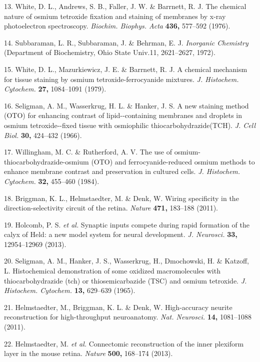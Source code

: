 \documentclass{article}
\newenvironment{reflist}{\par\small\setlength{\parindent}{0pt}\everypar{\hangindent=1.6em\hangafter=1}}{\par}
\begin{document}
\begin{reflist}
13. White, D. L., Andrews, S. B., Faller, J. W. \& Barrnett, R. J. The chemical nature of osmium tetroxide fixation and staining of membranes by x-ray photoelectron spectroscopy. \emph{Biochim. Biophys. Acta} \textbf{436,} 577–592 (1976).

14. Subbaraman, L. R., Subbaraman, J. \& Behrman, E. J. \emph{Inorganic Chemistry} (Department of Biochemistry, Ohio State Univ.11, 2621–2627, 1972).

15. White, D. L., Mazurkiewicz, J. E. \& Barrnett, R. J. A chemical mechanism for tissue staining by osmium tetroxide-ferrocyanide mixtures. \emph{J. Histochem. Cytochem.} \textbf{27,} 1084–1091 (1979).

16. Seligman, A. M., Wasserkrug, H. L. \& Hanker, J. S. A new staining method (OTO) for enhancing contrast of lipid-{}-containing membranes and droplets in osmium tetroxide-{}-fixed tissue with osmiophilic thiocarbohydrazide(TCH). \emph{J. Cell Biol.} \textbf{30,} 424–432 (1966).

17. Willingham, M. C. \& Rutherford, A. V. The use of osmium-thiocarbohydrazide-osmium (OTO) and ferrocyanide-reduced osmium methods to enhance membrane contrast and preservation in cultured cells. \emph{J. Histochem. Cytochem.} \textbf{32,} 455–460 (1984).

18. Briggman, K. L., Helmstaedter, M. \& Denk, W. Wiring specificity in the direction-selectivity circuit of the retina. \emph{Nature} \textbf{471,} 183–188 (2011).

19. Holcomb, P. S. \emph{et al.} Synaptic inputs compete during rapid formation of the calyx of Held: a new model system for neural development. \emph{J. Neurosci.} \textbf{33,} 12954–12969 (2013).

20. Seligman, A. M., Hanker, J. S., Wasserkrug, H., Dmochowski, H. \& Katzoff, L. Histochemical demonstration of some oxidized macromolecules with thiocarbohydrazide (tch) or thiosemicarbazide (TSC) and osmium tetroxide. \emph{J. Histochem. Cytochem.} \textbf{13,} 629–639 (1965).

21. Helmstaedter, M., Briggman, K. L. \& Denk, W. High-accuracy neurite reconstruction for high-throughput neuroanatomy. \emph{Nat. Neurosci.} \textbf{14,} 1081–1088 (2011).

22. Helmstaedter, M. \emph{et al.} Connectomic reconstruction of the inner plexiform layer in the mouse retina. \emph{Nature} \textbf{500,} 168–174 (2013).
\end{reflist}
\end{document}

